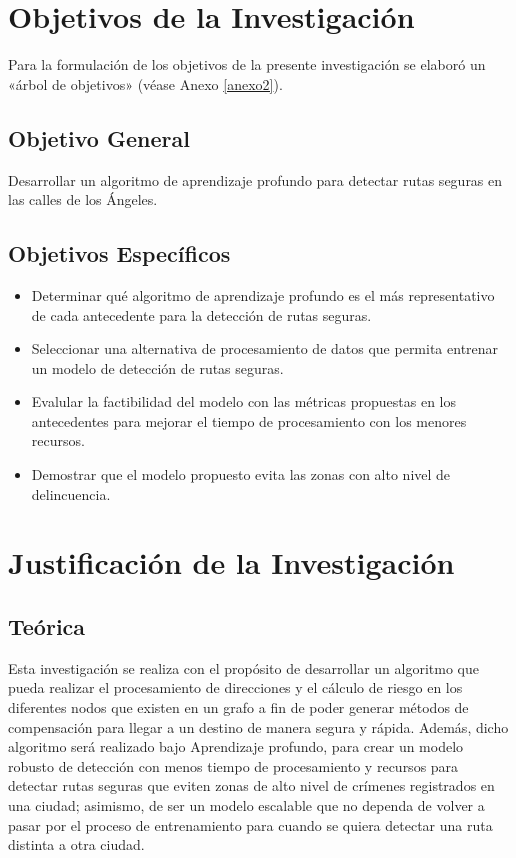 \section{Objetivos de la Investigación}
Para la formulación de los objetivos de la presente investigación se elaboró un «árbol de objetivos» (véase Anexo \ref{anexo2}).
\subsection{Objetivo General}
\newcommand{\ObjetivoGeneral}{
Desarrollar un algoritmo de aprendizaje profundo para detectar rutas seguras en las calles de los Ángeles.
}
\ObjetivoGeneral
\subsection{Objetivos Espec\'{i}ficos}
\newcommand{\Objone}{
Determinar qué algoritmo de aprendizaje profundo es el más representativo de cada antecedente para la detección de rutas seguras.
}
\newcommand{\Objtwo}{
Seleccionar una alternativa de procesamiento de datos que permita entrenar un modelo de detección de rutas seguras.
}
\newcommand{\Objthree}{
Evalular la factibilidad del modelo con las métricas propuestas en los antecedentes para mejorar el tiempo de procesamiento con los menores recursos.
}
\newcommand{\Objfour}{
Demostrar que el modelo propuesto evita las zonas con alto nivel de delincuencia.
}

\begin{itemize}
	\item {\Objone}
	\item {\Objtwo}
	\item {\Objthree}
	\item {\Objfour}
\end{itemize}

\section{Justificación de la Investigación}

\subsection{Teórica}
Esta investigación se realiza con el propósito de desarrollar un algoritmo que pueda realizar el procesamiento de direcciones y el cálculo de riesgo en los diferentes nodos que existen en un grafo a fin de poder generar métodos de compensación para llegar a un destino de manera segura y rápida. Además, dicho algoritmo será realizado bajo Aprendizaje profundo, para crear un modelo robusto de detección con menos tiempo de procesamiento y recursos para detectar rutas seguras que eviten zonas de alto nivel de crímenes registrados en una ciudad; asimismo, de ser un modelo escalable que no dependa de volver a pasar por el proceso de entrenamiento para cuando se quiera detectar una ruta distinta a otra ciudad.

